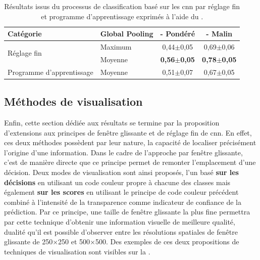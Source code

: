 \begin{table}[H]
    \centering
    \begin{tabular}{llcc}
        \toprule
        Catégorie                               & Global Pooling                    & \Fscore{} - Pondéré                           & \Fscore{} - Malin                             \\ \midrule
        \multirow{2}{*}{Réglage fin}            & Maximum                           & 0,44$\pm$0,05                                 & 0,69$\pm$0,06                                 \\ \cline{2-4}
                                                & \cellcolor[HTML]{E7E6E6}Moyenne   & \cellcolor[HTML]{E7E6E6}\textbf{0,56$\pm$0,05}& \cellcolor[HTML]{E7E6E6}\textbf{0,78$\pm$0,05}\\ \midrule
        Programme d'apprentissage               & Moyenne                           & 0,51$\pm$0,07                                 & 0,67$\pm$0,05                                 \\
        \bottomrule
    \end{tabular}
    
    \caption{Résultats issus du processus de classification basé sur les \gls{cnn} par réglage fin et programme d'apprentissage exprimés à l'aide du \fscore.}
    \label{tab:parameters_image_improvement_fine}
\end{table}
\clearpage

\subsection{Méthodes de visualisation}
Enfin, cette section dédiée aux résultats se termine par la proposition d'extensions aux principes de fenêtre glissante et de réglage fin de \gls{cnn}. En effet, ces deux méthodes possèdent par leur nature, la capacité de localiser précisément l'origine d'une information. Dans le cadre de l'approche par fenêtre glissante, c'est de manière directe que ce principe permet de remonter l'emplacement d'une décision. Deux modes de visualisation sont ainsi proposés, l'un basé \textbf{sur les décisions} en utilisant un code couleur propre à chacune des classes mais également \textbf{sur les scores} en utilisant le principe de code couleur précédent combiné à l'intensité de la transparence comme indicateur de confiance de la prédiction. Par ce principe, une taille de fenêtre glissante la plus fine permettra par cette technique d'obtenir une information visuelle de meilleure qualité, dualité qu'il est possible d'observer entre les résolutions spatiales de fenêtre glissante de 250$\times$250 et 500$\times$500. Des exemples de ces deux propositions de techniques de visualisation sont visibles sur la .\par

